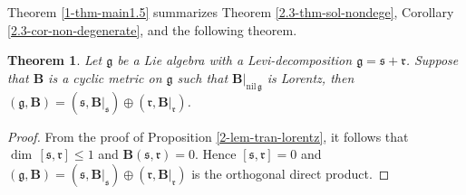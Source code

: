 \documentclass[reqno]{amsart}
\newtheorem{thm}{Theorem}[section]
\theoremstyle{definition}
\begin{document}
Theorem \ref{1-thm-main1.5} summarizes Theorem \ref{2.3-thm-sol-nondege},  Corollary \ref{2.3-cor-non-degenerate}, and the following theorem.
\begin{thm}\label{2.3-thm-lorentz}
Let $\mathfrak{g}$ be a  Lie algebra   with a Levi-decomposition $\mathfrak{g}=\mathfrak{s}+\mathfrak{r}$.
 Suppose that
 $\mathbf{B}$ is a cyclic metric on  $\mathfrak{g}$ such that
  $\mathbf{B}|_{\mathrm{nil}\,\mathfrak{g}}$ is Lorentz,
then $(\mathfrak{g},\mathbf{B})
 =(\mathfrak{s},\mathbf{B}|_{\mathfrak{s}})\oplus(\mathfrak{r},\mathbf{B}|_{\mathfrak{r}})$.
\end{thm}
\begin{proof}
 From the proof of   Proposition \ref{2-lem-tran-lorentz}, it follows that $\dim\,[\mathfrak{s},\mathfrak{r}]\leq 1$ and
$\mathbf{B}(\mathfrak{s},\mathfrak{r})=0$.
Hence $[\mathfrak{s},\mathfrak{r}]=0$ and $(\mathfrak{g},\mathbf{B})
 =(\mathfrak{s},\mathbf{B}|_{\mathfrak{s}})\oplus(\mathfrak{r},\mathbf{B}|_{\mathfrak{r}})$
 is the orthogonal direct product.
\end{proof}
\end{document}
